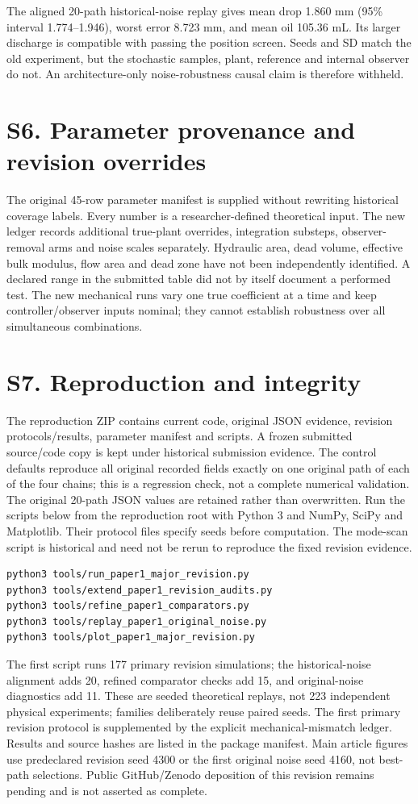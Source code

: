 \documentclass[11pt,a4paper]{article}
\begin{document}
The aligned 20-path historical-noise replay gives mean drop 1.860 mm (95\% interval 1.774--1.946), worst error 8.723 mm, and mean oil 105.36 mL. Its larger discharge is compatible with passing the position screen. Seeds and SD match the old experiment, but the stochastic samples, plant, reference and internal observer do not. An architecture-only noise-robustness causal claim is therefore withheld.
\section*{S6. Parameter provenance and revision overrides}
The original 45-row parameter manifest is supplied without rewriting historical coverage labels. Every number is a researcher-defined theoretical input. The new ledger records additional true-plant overrides, integration substeps, observer-removal arms and noise scales separately. Hydraulic area, dead volume, effective bulk modulus, flow area and dead zone have not been independently identified. A declared range in the submitted table did not by itself document a performed test. The new mechanical runs vary one true coefficient at a time and keep controller/observer inputs nominal; they cannot establish robustness over all simultaneous combinations.

\section*{S7. Reproduction and integrity}
The reproduction ZIP contains current code, original JSON evidence, revision protocols/results, parameter manifest and scripts. A frozen submitted source/code copy is kept under historical submission evidence. The control defaults reproduce all original recorded fields exactly on one original path of each of the four chains; this is a regression check, not a complete numerical validation. The original 20-path JSON values are retained rather than overwritten. Run the scripts below from the reproduction root with Python 3 and NumPy, SciPy and Matplotlib. Their protocol files specify seeds before computation. The mode-scan script is historical and need not be rerun to reproduce the fixed revision evidence.
\begin{verbatim}
python3 tools/run_paper1_major_revision.py
python3 tools/extend_paper1_revision_audits.py
python3 tools/refine_paper1_comparators.py
python3 tools/replay_paper1_original_noise.py
python3 tools/plot_paper1_major_revision.py
\end{verbatim}
The first script runs 177 primary revision simulations; the historical-noise alignment adds 20, refined comparator checks add 15, and original-noise diagnostics add 11. These are seeded theoretical replays, not 223 independent physical experiments; families deliberately reuse paired seeds. The first primary revision protocol is supplemented by the explicit mechanical-mismatch ledger. Results and source hashes are listed in the package manifest. Main article figures use predeclared revision seed 4300 or the first original noise seed 4160, not best-path selections. Public GitHub/Zenodo deposition of this revision remains pending and is not asserted as complete.
\end{document}
